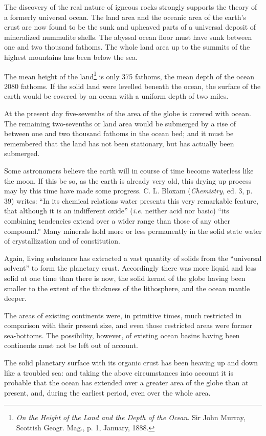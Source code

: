 \documentclass[a4paper, 12pt, oneside]{article}
\begin{document}
The discovery of the real nature of igneous rocks strongly supports the theory of a formerly universal ocean. The land area and the oceanic area of the earth's crust are now found to be the sunk and upheaved parts of a universal deposit of mineralized nummulite shells. The abyssal ocean floor must have sunk between one and two thousand fathoms. The whole land area up to the summits of the highest mountains has been below the sea.

The mean height of the land\footnote{\emph{On the Height of the Land and the Depth of the Ocean}. Sir John Murray, Scottish Geogr. Mag., p. 1, January, 1888.} is only 375 fathoms, the mean depth of the ocean 2080 fathoms. If the solid land were levelled beneath the ocean, the surface of the earth would be covered by an ocean with a uniform depth of two miles.

At the present day five-sevenths of the area of the globe is covered with ocean. The remaining two-sevenths or land area would be submerged by a rise of between one and two thousand fathoms in the ocean bed; and it must be remembered that the land has not been stationary, but has actually been submerged.

Some astronomers believe the earth will in course of time become waterless like the moon. If this be so, as the earth is already very old, this drying up process may by this time have made some progress. C. L. Bloxam (\emph{Chemistry}, ed. 3, p. 39) writes: ``In its chemical relations water presents this very remarkable feature, that although it is an indifferent oxide'' (\emph{i.e.} neither acid nor basic) ``its combining tendencies extend over a wider range than those of any other compound.'' Many minerals hold more or less permanently in the solid state water of crystallization and of constitution.

Again, living substance has extracted a vast quantity of solids from the ``universal solvent'' to form the planetary crust. Accordingly there was more liquid and less solid at one time than there is now, the solid kernel of the globe having been smaller to the extent of the thickness of the lithosphere, and the ocean mantle deeper.

The areas of existing continents were, in primitive times, much restricted in comparison with their present size, and even those restricted areas were former sea-bottoms. The possibility, however, of existing ocean basins having been continents must not be left out of account.

The solid planetary surface with its organic crust has been heaving up and down like a troubled sea: and taking the above circumstances into account it is probable that the ocean has extended over a greater area of the globe than at present, and, during the earliest period, even over the whole area.
\end{document}
